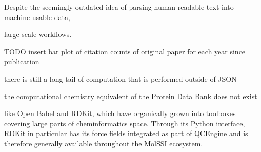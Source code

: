 \documentclass[num-refs]{wiley-article}
\begin{document}
Despite the seemingly outdated idea of parsing human-readable text into machine-usable data,

large-scale workflows.\cite{Abbott2019,St.John2020}

TODO insert bar plot of citation counts of original paper for each year since publication

there is still a long tail of computation that is performed outside of JSON

the computational chemistry equivalent of the Protein Data Bank does not exist

like Open Babel and RDKit, which have organically grown into toolboxes covering large parts of cheminformatics space. Through its Python interface, RDKit in particular has its force fields integrated as part of QCEngine and is therefore generally available throughout the MolSSI ecosystem.
\end{document}
